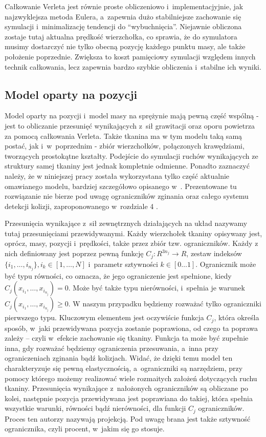 			Całkowanie Verleta jest równie proste obliczeniowo i~implementacjyjnie, jak najzwyklejsza metoda Eulera, a~zapewnia dużo stabilniejsze zachowanie się symulacji i~minimalizację tendencji do ``wybuchnięcia''. Niejawnie obliczona zostaje tutaj aktualna prędkość wierzchołka, co sprawia, że do symulatora musimy dostarczyć nie tylko obecną pozycję każdego punktu masy, ale także położenie poprzednie. Zwiększa to koszt pamięciowy symulacji względem innych technik całkowania, lecz zapewnia bardzo szybkie obliczenia i~stabilne ich wyniki.
		
		\subsection{Model oparty na pozycji}
		\label{t:teoria:analiza:poz}
		
			Model oparty na pozycji i~model masy na sprężynie mają pewną część wspólną - jest to obliczanie przesunięć wynikających z~sił grawitacji oraz oporu powietrza za pomocą całkowania Verleta. Także tkanina ma w tym modelu taką samą postać, jak i~w~poprzednim - zbiór wierzchołków, połączonych krawędziami, tworzących prostokątne kształty. Podejście do symulacji ruchów wynikających ze struktury samej tkaniny jest jednak kompletnie odmienne. Ponadto zaznaczyć należy, że w niniejszej pracy została wykorzystana tylko część aktualnie omawianego modelu, bardziej szczegółowo opisanego w~\cite{posbased}. Prezentowane tu rozwiązanie nie bierze pod uwagę ograniczników zginania oraz całego systemu detekcji kolizji, zaproponowanego w~rozdziale 4 \cite{posbased}.
			
			Przesunięcia wynikające z~sił zewnętrznych działających na układ nazywamy tutaj przesunięciami przewidywanymi. Każdy wierzchołek tkaniny opisywany jest, oprócz, masy, pozycji i~prędkości, także przez zbiór tzw. ograniczników. Każdy z nich definiowany jest poprzez pewną funkcję \(C_{j} : R^{3n_{j}} \rightarrow R\), zestaw indeksów \(\{ i_{1}, \dots, i_{n_{j}}  \}, i_{k} \in [1, \dots, N] \) i~parametr sztywności \(k \in [0\dots1] \). Ogranicznik może być typu równości, co oznacza, że jego ograniczenie jest spełnione, kiedy \( C_{j}(x_{i_{1}}, \dots, x_{i_{n_{j}}} ) = 0 \). Może być także typu nierówności, i~spełnia je warunek \( C_{j}(x_{i_{1}}, \dots, x_{i_{n_{j}}} ) \geq 0 \). W naszym przypadku będziemy rozważać tylko ograniczniki pierwszego typu. Kluczowym elementem jest oczywiście funkcja \(C_{j}\), która określa sposób, w~jaki przewidywana pozycja zostanie poprawiona, od czego ta poprawa zależy -- czyli w~efekcie zachowanie się tkaniny. Funkcja ta może być zupełnie inna, gdy rozważać będziemy ograniczenia przesuwania, a~inna przy ograniczeniach zginania bądź kolizjach. Widać, że dzięki temu model ten charakteryzuje się pewną elastycznością, a~ograniczniki są narzędziem, przy pomocy którego możemy realizować wiele rozmaitych założeń dotyczących ruchu tkaniny. Przesunięcia wynikające z~nałożonych ograniczników są obliczane po kolei, następnie pozycja przewidywana jest poprawiana do takiej, która spełnia wszystkie warunki, równości bądź nierówności, dla funkcji \(C_{j}\) ograniczników. Proces ten autorzy \cite{posbased} nazywają projekcją. Pod uwagę brana jest także sztywność ogranicznika, czyli procent, w~jakim się go stosuje.
			
